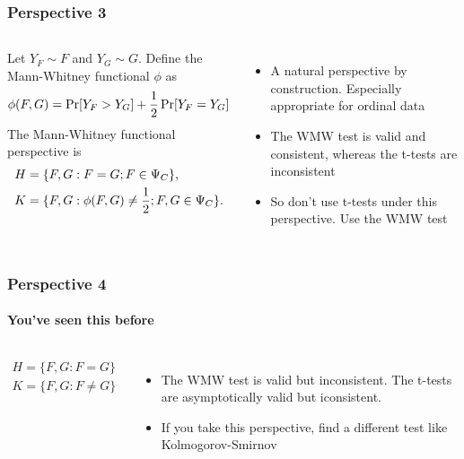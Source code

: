 \begin{frame}\frametitle{Perspective 3}
	\begin{columns}
				\begin{per}
			Let $Y_F \sim F$ and $Y_G \sim G$.
			Define the \alert{Mann-Whitney functional} $\phi$ as
			\vspace{-1em}
			\begin{equation*}\vspace{-1em}
				\phi(F,G) = \Pr[Y_F > Y_G] + \frac{1}{2}\Pr[Y_F=Y_G]
			\end{equation*}
		The \alert{Mann-Whitney functional perspective} is
		\vspace{-1em}
			\begin{align*}\vspace{-1em}
				H &= \{F, G: F=G; F \in \Psi_C\},\\
				K &= \{F, G: \phi(F,G)\neq\frac{1}{2}; F,G \in \Psi_C \}.
			\end{align*}
		\end{per}
		\begin{itemize}
			\item A natural perspective by construction. Especially appropriate for ordinal data
			\item The WMW test is valid and consistent, whereas the t-tests are inconsistent
			\item So don't use t-tests under this perspective. Use the WMW test
		\end{itemize}
	\end{columns}
\end{frame}




\begin{frame}\frametitle{Perspective 4}
	\framesubtitle{You've seen this before}
	\begin{columns}
		\column{0.95\linewidth}
		\begin{per}
			\vspace{-1.5em}
		\begin{align*}
			H=\{F,G:F=G\}\\
			K=\{F,G:F\neq G\}
		\end{align*}
		\end{per}
		\begin{itemize}
			\item The WMW test is valid but inconsistent. The t-tests are asymptotically valid but iconsistent.
			\item If you take this perspective, find a different test like Kolmogorov-Smirnov
		\end{itemize}
	\end{columns}
\end{frame}

